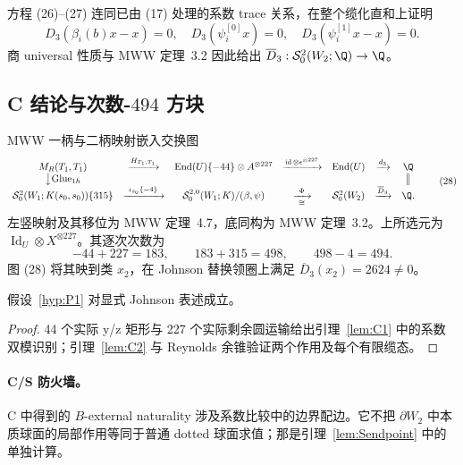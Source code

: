 方程 (26)--(27) 连同已由 (17) 处理的系数 trace 关系，在整个缆化直和上证明
\[
D_3(\beta_i(b)x-x)=0,\quad
D_3(\psi_i^{[0]}x)=0,\quad
D_3(\psi_i^{[1]}x-x)=0.
\]
商 universal 性质与 MWW 定理~3.2 因此给出 $\overline D_3:\mathcal S^2_0(W_2;\Q)\to\Q$。

\subsection{C 结论与次数-$494$ 方块}

MWW 一柄与二柄映射嵌入交换图
\[
\begin{array}{ccccccc}
M_R(T_1,T_1)&\xrightarrow{H_{T_1,T_1}}&
\operatorname{End}(U)\{-44\}\otimes A^{\otimes227}
&\xrightarrow{\operatorname{id}\otimes\epsilon^{\otimes227}}&
\operatorname{End}(U)&\xrightarrow{d_3}&\Q\\
\big\downarrow{\mathrm{Glue}_{1h}}&&&&&&\big\Vert\\
\mathcal S^2_0(W_1;K(s_0,s_0))\{315\}
&\xrightarrow{\ \iota_{s_0}\{-4\}\ }&
\mathcal S^{2,0}_0(W_1;K)/(\beta,\psi)
&\xrightarrow[\cong]{\ \Phi\ }&\mathcal S^2_0(W_2)
&\xrightarrow{\overline D_3}&\Q.
\end{array}
\tag{28}
\]
左竖映射及其移位为 MWW 定理~4.7，底同构为 MWW 定理~3.2。上所选元为 $\operatorname{Id}_U\otimes X^{\otimes227}$。其逐次次数为
\[
-44+227=183,\qquad183+315=498,\qquad498-4=494.
\]
图 (28) 将其映到类 $x_2$，在 Johnson 替换领圈上满足 $\overline D_3(x_2)=2624\ne0$。

\begin{theorem}[系数比较 C]\label{thm:Cdischarge}
假设~\ref{hyp:P1} 对显式 Johnson 表述成立。
\end{theorem}

\begin{proof}
44 个实际 y/z 矩形与 227 个实际剩余圆运输给出引理~\ref{lem:C1} 中的系数双模识别；引理~\ref{lem:C2} 与 Reynolds 余锥验证两个作用及每个有限缆态。
\end{proof}

\paragraph{C/S 防火墙。}
C 中得到的 $B$-external naturality 涉及系数比较中的边界配边。它不把 $\partial W_2$ 中本质球面的局部作用等同于普通 dotted 球面求值；那是引理~\ref{lem:Sendpoint} 中的单独计算。
